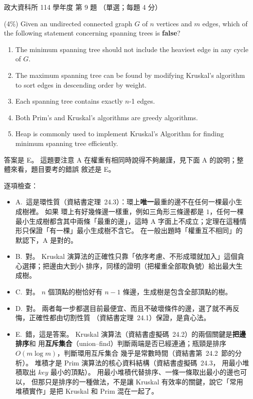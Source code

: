 \begin{pastexam}[label={px:nccu-114-dsa-09}]{政大資科所 114 學年度 第 9 題}
（單選；每題 4 分）

(4\%) Given an undirected connected graph $G$ of $n$ vertices and $m$ edges, which of the following
statement concerning spanning trees is \textbf{false}?
\begin{enumerate}[label=\Alph*.]
\item The minimum spanning tree should not include the heaviest edge in any cycle of $G$.
\item The maximum spanning tree can be found by modifying Kruskal's algorithm to sort edges in
descending order by weight.
\item Each spanning tree contains exactly $n$-1 edges.
\item Both Prim's and Kruskal's algorithms are greedy algorithms.
\item Heap is commonly used to implement Kruskal's Algorithm for finding minimum spanning tree
efficiently.
\end{enumerate}
\end{pastexam}

\begin{pastsoln}
答案是 E。 這題要注意 A 在權重有相同時說得不夠嚴謹，見下面 A 的說明；整體來看，題目要考的錯誤
敘述是 E。

逐項檢查：
\begin{itemize}
\item A.~這是環性質（資結書定理~24.3）：環上\textbf{唯一}最重的邊不在任何一棵最小生成樹裡。 如果
環上有好幾條邊一樣重，例如三角形三條邊都是 $1$，任何一棵最小生成樹都含其中兩條「最重的邊」，這時
A 字面上不成立；定理在這種情形只保證「有一棵」最小生成樹不含它。 在一般出題時「權重互不相同」的
默認下，A 是對的。
\item B.~對。 Kruskal 演算法的正確性只靠「依序考慮、不形成環就加入」這個貪心選擇；把邊由大到小
排序，同樣的證明（把權重全部取負號）給出最大生成樹。
\item C.~對。 $n$ 個頂點的樹恰好有 $n - 1$ 條邊，生成樹是包含全部頂點的樹。
\item D.~對。 兩者每一步都選目前最便宜、而且不破壞條件的邊，選了就不再反悔，正確性都由切割性質
（資結書定理~24.1）保證，是貪心法。
\item E.~錯，這是答案。 Kruskal 演算法（資結書虛擬碼~24.2）的兩個關鍵是\textbf{把邊排序}和
用\textbf{互斥集合}（union--find）判斷兩端是否已經連通；瓶頸是排序 $O(m \log m)$，判斷環用互斥集合
幾乎是常數時間（資結書第~24.2~節的分析）。 堆積才是 Prim 演算法的核心資料結構（資結書虛擬碼~24.3，
用最小堆積取出 $\mathit{key}$ 最小的頂點）。 用最小堆積代替排序、一條一條取出最小的邊也可以，
但那只是排序的一種做法，不是讓 Kruskal 有效率的關鍵，說它「常用堆積實作」是把 Kruskal 和 Prim
混在一起了。
\end{itemize}
\end{pastsoln}
